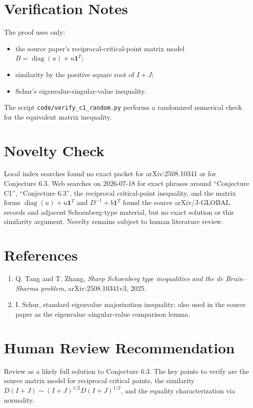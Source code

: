\documentclass[11pt]{article}
\DeclareMathOperator{\diag}{diag}
\newcommand{\one}{\mathbf{1}}
\begin{document}
\section{Verification Notes}

The proof uses only:
\begin{itemize}[leftmargin=2em]
  \item the source paper's reciprocal-critical-point matrix model
  \(B=\diag(u)+u\one^T\);
  \item similarity by the positive square root of \(I+J\);
  \item Schur's eigenvalue-singular-value inequality.
\end{itemize}
The script \texttt{code/verify\_c1\_random.py} performs a randomized numerical
check for the equivalent matrix inequality.

\section{Novelty Check}

Local index searches found no exact packet for arXiv:2508.10341 or for
Conjecture 6.3.  Web searches on 2026-07-18 for exact phrases around
``Conjecture C1'', ``Conjecture 6.3'', the reciprocal critical-point
inequality, and the matrix forms \(\diag(u)+u\one^T\) and \(D^{-1}+b\one^T\)
found the source arXiv/J-GLOBAL records and adjacent Schoenberg-type material,
but no exact solution or this similarity argument.  Novelty remains subject to
human literature review.

\section{References}

\begin{enumerate}[leftmargin=2em]
  \item Q. Tang and T. Zhang,
  \emph{Sharp Schoenberg type inequalities and the de Bruin--Sharma problem},
  arXiv:2508.10341v3, 2025.
  \item I. Schur, standard eigenvalue majorization inequality; also used in
  the source paper as the eigenvalue--singular-value comparison lemma.
\end{enumerate}

\section{Human Review Recommendation}

Review as a likely full solution to Conjecture 6.3.  The key points to verify
are the source matrix model for reciprocal critical points, the similarity
\(D(I+J)\sim (I+J)^{1/2}D(I+J)^{1/2}\), and the equality characterization via
normality.
\end{document}

